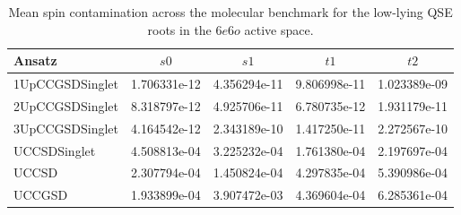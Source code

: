 \begin{table}[htbp]
    \centering
    \small
    \caption{Mean spin contamination across the molecular benchmark for the low-lying QSE roots in the $6e6o$ active space.}
    \label{tab:si-low-lying-spin-contamination}
    \begin{tabular}{l*{4}{S[exponent-mode=scientific, table-format=1.3e-2, round-mode=figures, round-precision=3]}}
        \toprule
        Ansatz & {$s0$} & {$s1$} & {$t1$} & {$t2$} \\
        \midrule
        1UpCCGSDSinglet & 1.706331e-12 & 4.356294e-11 & 9.806998e-11 & 1.023389e-09 \\
        2UpCCGSDSinglet & 8.318797e-12 & 4.925706e-11 & 6.780735e-12 & 1.931179e-11 \\
        3UpCCGSDSinglet & 4.164542e-12 & 2.343189e-10 & 1.417250e-11 & 2.272567e-10 \\
        UCCSDSinglet & 4.508813e-04 & 3.225232e-04 & 1.761380e-04 & 2.197697e-04 \\
        UCCSD & 2.307794e-04 & 1.450824e-04 & 4.297835e-04 & 5.390986e-04 \\
        UCCGSD & 1.933899e-04 & 3.907472e-03 & 4.369604e-04 & 6.285361e-04 \\
        \bottomrule
    \end{tabular}
\end{table}
